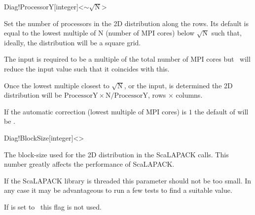 \begin{fdfentry}{Diag!ProcessorY}[integer]<$\sim \sqrt{\mathrm N}$>

  Set the number of processors in the 2D distribution along the rows.
  Its default is equal to the lowest multiple of $\mathrm N$ (number
  of MPI cores) below $\sqrt{\mathrm N}$ such that, ideally, the
  distribution will be a square grid.

  The input is required to be a multiple of the total number of MPI
  cores but \siesta\ will reduce the input value such that it
  coincides with this.

  Once the lowest multiple closest to $\sqrt{\mathrm N}$, or the input, is
  determined the 2D distribution will be $\mathrm{ProcessorY}
  \times\mathrm{N}/\mathrm{ProcessorY}$, rows $\times$ columns.

  \note If the automatic correction (lowest multiple of MPI cores) is
  $1$ the default of  will be \fdffalse.

\end{fdfentry}

\begin{fdfentry}{Diag!BlockSize}[integer]<>
  
  The block-size used for the 2D distribution in the ScaLAPACK calls.
  This number greatly affects the performance of ScaLAPACK.

  If the ScaLAPACK library is threaded this parameter should not be
  too small. In any case it may be advantageous to run a few tests to
  find a suitable value.

  \note If  is set to \fdffalse\ this flag is not
  used. 

\end{fdfentry}


